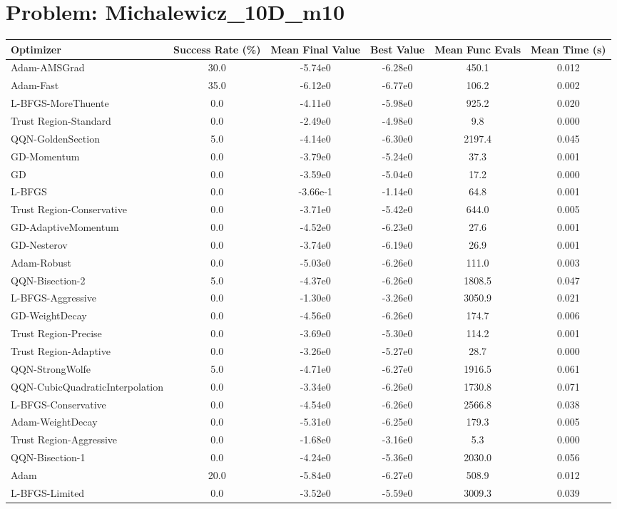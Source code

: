\documentclass{article}
\begin{document}
\section{Problem: Michalewicz\_10D\_m10}
\begin{longtable}{p{3cm}*{5}{c}}
\toprule
\textbf{Optimizer} & \textbf{Success Rate (\%)} & \textbf{Mean Final Value} & \textbf{Best Value} & \textbf{Mean Func Evals} & \textbf{Mean Time (s)} \\
\midrule
Adam-AMSGrad & 30.0 & -5.74e0 & -6.28e0 & 450.1 & 0.012 \\
Adam-Fast & 35.0 & -6.12e0 & -6.77e0 & 106.2 & 0.002 \\
L-BFGS-MoreThuente & 0.0 & -4.11e0 & -5.98e0 & 925.2 & 0.020 \\
Trust Region-Standard & 0.0 & -2.49e0 & -4.98e0 & 9.8 & 0.000 \\
QQN-GoldenSection & 5.0 & -4.14e0 & -6.30e0 & 2197.4 & 0.045 \\
GD-Momentum & 0.0 & -3.79e0 & -5.24e0 & 37.3 & 0.001 \\
GD & 0.0 & -3.59e0 & -5.04e0 & 17.2 & 0.000 \\
L-BFGS & 0.0 & -3.66e-1 & -1.14e0 & 64.8 & 0.001 \\
Trust Region-Conservative & 0.0 & -3.71e0 & -5.42e0 & 644.0 & 0.005 \\
GD-AdaptiveMomentum & 0.0 & -4.52e0 & -6.23e0 & 27.6 & 0.001 \\
GD-Nesterov & 0.0 & -3.74e0 & -6.19e0 & 26.9 & 0.001 \\
Adam-Robust & 0.0 & -5.03e0 & -6.26e0 & 111.0 & 0.003 \\
QQN-Bisection-2 & 5.0 & -4.37e0 & -6.26e0 & 1808.5 & 0.047 \\
L-BFGS-Aggressive & 0.0 & -1.30e0 & -3.26e0 & 3050.9 & 0.021 \\
GD-WeightDecay & 0.0 & -4.56e0 & -6.26e0 & 174.7 & 0.006 \\
Trust Region-Precise & 0.0 & -3.69e0 & -5.30e0 & 114.2 & 0.001 \\
Trust Region-Adaptive & 0.0 & -3.26e0 & -5.27e0 & 28.7 & 0.000 \\
QQN-StrongWolfe & 5.0 & -4.71e0 & -6.27e0 & 1916.5 & 0.061 \\
QQN-CubicQuadraticInterpolation & 0.0 & -3.34e0 & -6.26e0 & 1730.8 & 0.071 \\
L-BFGS-Conservative & 0.0 & -4.54e0 & -6.26e0 & 2566.8 & 0.038 \\
Adam-WeightDecay & 0.0 & -5.31e0 & -6.25e0 & 179.3 & 0.005 \\
Trust Region-Aggressive & 0.0 & -1.68e0 & -3.16e0 & 5.3 & 0.000 \\
QQN-Bisection-1 & 0.0 & -4.24e0 & -5.36e0 & 2030.0 & 0.056 \\
Adam & 20.0 & -5.84e0 & -6.27e0 & 508.9 & 0.012 \\
L-BFGS-Limited & 0.0 & -3.52e0 & -5.59e0 & 3009.3 & 0.039 \\
\bottomrule
\end{longtable}
\end{document}
